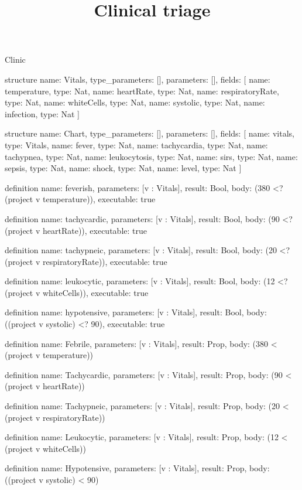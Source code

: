 \begin{lexlean}{Clinic}
\title{Clinical triage}
\begin{semanticmodule}
structure{
  name: Vitals,
  type_parameters: [],
  parameters: [],
  fields: [
    {name: temperature, type: Nat},
    {name: heartRate, type: Nat},
    {name: respiratoryRate, type: Nat},
    {name: whiteCells, type: Nat},
    {name: systolic, type: Nat},
    {name: infection, type: Nat}
  ]
}

structure{
  name: Chart,
  type_parameters: [],
  parameters: [],
  fields: [
    {name: vitals, type: Vitals},
    {name: fever, type: Nat},
    {name: tachycardia, type: Nat},
    {name: tachypnea, type: Nat},
    {name: leukocytosis, type: Nat},
    {name: sirs, type: Nat},
    {name: sepsis, type: Nat},
    {name: shock, type: Nat},
    {name: level, type: Nat}
  ]
}

definition{
  name: feverish,
  parameters: [v : Vitals],
  result: Bool,
  body: (380 <? (project v temperature)),
  executable: true
}

definition{
  name: tachycardic,
  parameters: [v : Vitals],
  result: Bool,
  body: (90 <? (project v heartRate)),
  executable: true
}

definition{
  name: tachypneic,
  parameters: [v : Vitals],
  result: Bool,
  body: (20 <? (project v respiratoryRate)),
  executable: true
}

definition{
  name: leukocytic,
  parameters: [v : Vitals],
  result: Bool,
  body: (12 <? (project v whiteCells)),
  executable: true
}

definition{
  name: hypotensive,
  parameters: [v : Vitals],
  result: Bool,
  body: ((project v systolic) <? 90),
  executable: true
}

definition{
  name: Febrile,
  parameters: [v : Vitals],
  result: Prop,
  body: (380 < (project v temperature))
}

definition{
  name: Tachycardic,
  parameters: [v : Vitals],
  result: Prop,
  body: (90 < (project v heartRate))
}

definition{
  name: Tachypneic,
  parameters: [v : Vitals],
  result: Prop,
  body: (20 < (project v respiratoryRate))
}

definition{
  name: Leukocytic,
  parameters: [v : Vitals],
  result: Prop,
  body: (12 < (project v whiteCells))
}

definition{
  name: Hypotensive,
  parameters: [v : Vitals],
  result: Prop,
  body: ((project v systolic) < 90)
}


\end{semanticmodule}
\end{lexlean}
